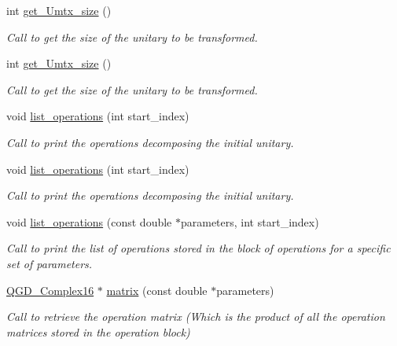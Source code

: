 \begin{DoxyCompactItemize}
int \hyperlink{class_decomposition___base_a3a1f83b85fd9e7e67a89a79b8cdc1e4a}{get\+\_\+\+Umtx\+\_\+size} ()
\begin{DoxyCompactList}\small\item\em Call to get the size of the unitary to be transformed. \end{DoxyCompactList}\item 
int \hyperlink{class_decomposition___base_a3a1f83b85fd9e7e67a89a79b8cdc1e4a}{get\+\_\+\+Umtx\+\_\+size} ()
\begin{DoxyCompactList}\small\item\em Call to get the size of the unitary to be transformed. \end{DoxyCompactList}\item 
void \hyperlink{class_decomposition___base_a4c6c81d70f49ee249aa455a4f2718ee2}{list\+\_\+operations} (int start\+\_\+index)
\begin{DoxyCompactList}\small\item\em Call to print the operations decomposing the initial unitary. \end{DoxyCompactList}\item 
void \hyperlink{class_decomposition___base_a4c6c81d70f49ee249aa455a4f2718ee2}{list\+\_\+operations} (int start\+\_\+index)
\begin{DoxyCompactList}\small\item\em Call to print the operations decomposing the initial unitary. \end{DoxyCompactList}\item 
void \hyperlink{class_operation__block_a29e2c74d7fa7344193a17e39248eb803}{list\+\_\+operations} (const double $\ast$parameters, int start\+\_\+index)
\begin{DoxyCompactList}\small\item\em Call to print the list of operations stored in the block of operations for a specific set of parameters. \end{DoxyCompactList}\item 
\hyperlink{struct_q_g_d___complex16}{Q\+G\+D\+\_\+\+Complex16} $\ast$ \hyperlink{class_operation__block_a916db3ef5d6fcf25367843a1306cd4e0}{matrix} (const double $\ast$parameters)
\begin{DoxyCompactList}\small\item\em Call to retrieve the operation matrix (Which is the product of all the operation matrices stored in the operation block) \end{DoxyCompactList}\item 

\end{DoxyCompactItemize}
